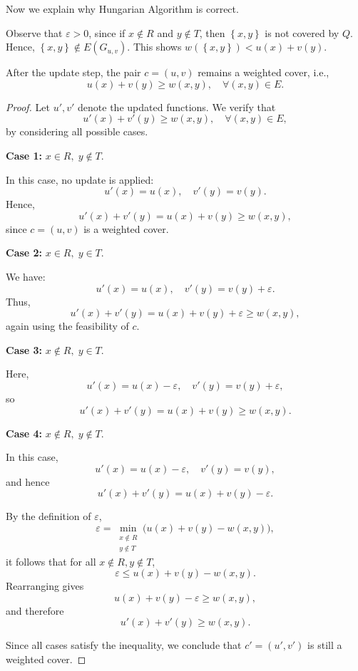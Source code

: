 Now we explain why Hungarian Algorithm is correct.

\begin{remark}
    Observe that \(\varepsilon > 0\), since if \(x \notin R\) and \(y \notin T\), then \(\left\{ x, y \right\} \) is not covered by \(Q\). Hence, \(\left\{ x, y \right\} \notin E(G_{u, v}) \). This shows \(w(\left\{ x, y \right\} ) < u(x) + v(y)\).       
\end{remark}

\begin{proposition}
After the update step, the pair \(c = (u,v)\) remains a weighted cover, i.e.,
\[
u(x) + v(y) \ge w(x,y), \quad \forall (x,y) \in E.
\]
\end{proposition}

\begin{proof}
Let \(u', v'\) denote the updated functions. We verify that
\[
u'(x) + v'(y) \ge w(x,y), \quad \forall (x,y) \in E,
\]
by considering all possible cases.

\medskip

\textbf{Case 1:} \(x \in R,\; y \notin T.\)

In this case, no update is applied:
\[
u'(x) = u(x), \quad v'(y) = v(y).
\]
Hence,
\[
u'(x) + v'(y) = u(x) + v(y) \ge w(x,y),
\]
since \(c = (u,v)\) is a weighted cover.

\medskip

\textbf{Case 2:} \(x \in R,\; y \in T.\)

We have:
\[
u'(x) = u(x), \quad v'(y) = v(y) + \varepsilon.
\]
Thus,
\[
u'(x) + v'(y) = u(x) + v(y) + \varepsilon \ge w(x,y),
\]
again using the feasibility of \(c\).

\medskip

\textbf{Case 3:} \(x \notin R,\; y \in T.\)

Here,
\[
u'(x) = u(x) - \varepsilon, \quad v'(y) = v(y) + \varepsilon,
\]
so
\[
u'(x) + v'(y) = u(x) + v(y) \ge w(x,y).
\]

\medskip

\textbf{Case 4:} \(x \notin R,\; y \notin T.\)

In this case,
\[
u'(x) = u(x) - \varepsilon, \quad v'(y) = v(y),
\]
and hence
\[
u'(x) + v'(y) = u(x) + v(y) - \varepsilon.
\]

By the definition of \(\varepsilon\),
\[
\varepsilon = \min_{\substack{x \notin R \\ y \notin T}} 
\bigl( u(x) + v(y) - w(x,y) \bigr),
\]
it follows that for all \(x \notin R, y \notin T\),
\[
\varepsilon \le u(x) + v(y) - w(x,y).
\]
Rearranging gives
\[
u(x) + v(y) - \varepsilon \ge w(x,y),
\]
and therefore
\[
u'(x) + v'(y) \ge w(x,y).
\]

\medskip

Since all cases satisfy the inequality, we conclude that \(c' = (u',v')\) is still a weighted cover.
\end{proof}

